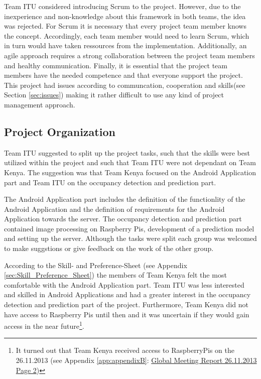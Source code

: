Team ITU considered introducing Scrum to the project. However, due to the inexperience and non-knowledge about this framework in both teams, the idea was rejected. For Scrum it is necessary that every project team member knows the concept. Accordingly, each team member would need to learn Scrum, which in turn would have taken ressources from the implementation. Additionally, an agile approach requires a strong collaboration between the project team members and healthy communication. Finally, it is essential that the project team members have the needed competence and that everyone support the project\cite{agile_project_management}. This project had issues according to communcation, cooperation and skills(see Section \ref{sec:issues}) making it rather difficult to use any kind of project management approach.



\subsection{Project Organization}
\label{sec:organization}
Team ITU suggested to split up the project tasks, such that the skills were best utilized within the project and such that Team ITU were not dependant on Team Kenya. The suggestion was that Team Kenya focused on the Android Application part and Team ITU on the occupancy detection and prediction part.

The Android Application part includes the definition of the functionlity of the Android Application and the definition of requirements for the Android Application towards the server. The occupancy detection and prediction part contained image processing on Raspberry Pis, development of a prediction model and setting up the server. Although the tasks were split each group was welcomed to make suggstions or give feedback on the work of the other group.

According to the Skill- and Preference-Sheet (see Appendix \ref{sec:Skill_Preference_Sheet}) the members of Team Kenya felt the most comfortable with the Android Application part. Team ITU was less interested and skilled in Android Applications and had a greater interest in the occupancy detection and prediction part of the project. Furthermore, Team Kenya did not have access to Raspberry Pis until then and it was uncertain if they would gain access in the near future\footnote{It turned out that Team Kenya received access to RaspberryPis on the 26.11.2013 (see Appendix \ref{app:appendixB}: \hyperlink{GSD20131126.2}{Global Meeting Report 26.11.2013 Page 2})}.

